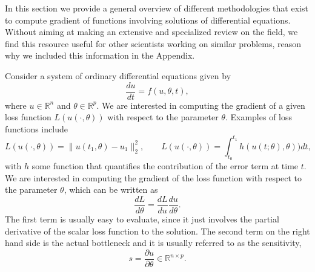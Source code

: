 In this section we provide a general overview of different methodologies that exist to compute gradient of functions involving solutions of differential equations. Without aiming at making an extensive and specialized review on the field, we find this resource useful for other scientists working on similar problems, reason why we included this information in the Appendix.

Consider a system of ordinary differential equations given by
\begin{equation}
 \frac{du}{dt} = f(u, \theta, t),
 \label{eq:original_ODE}
\end{equation}
where $u \in \mathbb{R}^n$ and $\theta \in \mathbb R^p$. We are interested in computing the gradient of a given loss function $L(u(\cdot, \theta))$ with respect to the parameter $\theta$. Examples of loss functions include
\begin{equation}
 L(u(\cdot, \theta)) = \| u(t_1, \theta) - u_1 \|_2^2,
 \qquad
 L(u(\cdot, \theta)) = \int_{t_0}^{t_1} h( u(t;\theta), \theta) ) dt, 
\end{equation}
with $h$ some function that quantifies the contribution of the error term at time $t$.
We are interested in computing the gradient of the loss function with respect to the parameter $\theta$, which can be written as
\begin{equation}
 \frac{dL}{d\theta} = \frac{dL}{du} \frac{du}{d\theta}.
 \label{eq:dLdtheta_VJP}
\end{equation} 
The first term is usually easy to evaluate, since it just involves the partial derivative of the scalar loss function to the solution. The second term on the right hand side is the actual bottleneck and it is usually referred to as the sensitivity,
\begin{equation}
 s = \frac{\partial u}{\partial \theta} \in \mathbb R^{n \times p}.
\end{equation}

